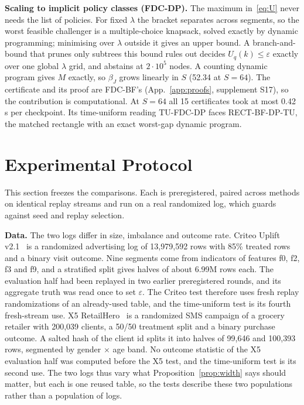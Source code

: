 \documentclass[sigconf,anonymous,review]{acmart}
\newcommand{\eps}{\varepsilon}
\begin{document}
\textbf{Scaling to implicit policy classes (FDC-DP).} The maximum in~\eqref{eq:U} never needs the list of policies. For fixed $\lambda$ the bracket separates across segments, so the worst feasible challenger is a multiple-choice knapsack, solved exactly by dynamic programming; minimising over $\lambda$ outside it gives an upper bound. A branch-and-bound that prunes only subtrees this bound rules out decides $U_q(k) \le \eps$ exactly over one global $\lambda$ grid, and abstains at $2 \cdot 10^5$ nodes. A counting dynamic program gives $M$ exactly, so $\beta_J$ grows linearly in $S$ (52.34 at $S = 64$). The certificate and its proof are FDC-BF's (App.~\ref{app:proofs}, supplement S17), so the contribution is computational. At $S = 64$ all 15 certificates took at most 0.42\,s per checkpoint. Its time-uniform reading TU-FDC-DP faces RECT-BF-DP-TU, the matched rectangle with an exact worst-gap dynamic program.

\section{Experimental Protocol}\label{sec:protocol}

This section freezes the comparisons. Each is preregistered, paired across methods on identical replay streams and run on a real randomized log, which guards against seed and replay selection.

\textbf{Data.} The two logs differ in size, imbalance and outcome rate. Criteo Uplift v2.1~\citep{diemert2018large} is a randomized advertising log of 13,979,592 rows with 85\% treated rows and a binary visit outcome. Nine segments come from indicators of features f0, f2, f3 and f9, and a stratified split gives halves of about 6.99M rows each. The evaluation half had been replayed in two earlier preregistered rounds, and its aggregate truth was read once to set $\eps$. The Criteo test therefore uses fresh replay randomizations of an already-used table, and the time-uniform test is its fourth fresh-stream use. X5 RetailHero~\citep{x5retailhero2019} is a randomized SMS campaign of a grocery retailer with 200,039 clients, a 50/50 treatment split and a binary purchase outcome. A salted hash of the client id splits it into halves of 99,646 and 100,393 rows, segmented by gender $\times$ age band. No outcome statistic of the X5 evaluation half was computed before the X5 test, and the time-uniform test is its second use. The two logs thus vary what Proposition~\ref{prop:width} says should matter, but each is one reused table, so the tests describe these two populations rather than a population of logs.
\end{document}
